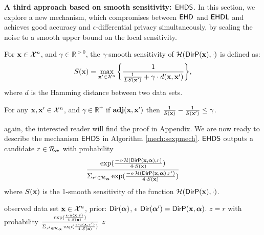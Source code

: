 \documentclass{article}
\begin{document}
\noindent \textbf{A third approach based on smooth sensitivity: $\hexpmech$}. 
\label{sec_ehds}
In this section, we explore a new mechanism, which compromises between $\mathsf{EHD}$ and $\mathsf{EHDL}$ and  achieves good accuracy and $\epsilon$-differential privacy simultaneously,
by scaling the noise to a smooth upper bound on the local sensitivity.
\begin{definition}
\label{def_gamma_smooth}
For $\textbf{x}\in\mathcal{X}^n$, and $\gamma \in \mathbb{R}^{> 0}$, the $\gamma$-smooth sensitivity of $\mathcal{H}(\mathsf{DirP}(\textbf{x}),\cdot)$ is defined as:
\begin{equation}
  \label{eq_smooth}
   S(\textbf{x})=\max_{\textbf{x}' \in \mathcal{X}^{n}}\bigg \{ \frac{1}{\frac{1}{LS(\textbf{x}')} +\gamma \cdot d(\textbf{x},\textbf{x}')} \bigg \},
\end{equation}
where $d$ is the Hamming distance between two data sets.
\end{definition}

\begin{thm}
  \label{thm_gamma_smooth}
  For any $\textbf{x}, \textbf{x}'\in\mathcal{X}^n$, and $\gamma \in \mathbb{R}^{+}$
  if  $\textbf{adj}(\textbf{x},\textbf{x}')$ then $\frac{1}{S(\textbf{x})} - \frac{1}{S(\textbf{x}')} \leq \gamma$.
\end{thm}
again, the interested reader will find the proof in Appendix.
We are now ready to describe the mechanism $\hexpmech$ in Algorithm \ref{mech:sexpmech}. $\hexpmech$ outputs a candidate $r \in \mathcal{R}_{\boldsymbol{\alpha}}$ with probability
\[
 \frac
  {\exp(\frac{-\epsilon\cdot \mathcal{H}(\mathsf{DirP}(\textbf{x},\boldsymbol{\alpha}), r)}{4\cdot S(\textbf{x})})}
{\Sigma_{r' \in \mathcal{R}_{\boldsymbol{\alpha}}}\exp(\frac{-\epsilon\cdot \mathcal{H}(\mathsf{DirP}(\textbf{x},\boldsymbol{\alpha}), r')}{4\cdot S(\textbf{x})})}
\]
where $S(\textbf{x})$ is the 1-smooth sensitivity of  the function $\mathcal{H}(\mathsf{DirP}(\textbf{x}),\cdot)$. {\color{red}{why do we choose 1???}}
  \begin{algorithm}
  \caption{$\hexpmech$}
  \label{mech:sexpmech}
  \begin{algorithmic}
  \INPUT observed data set $\textbf{x} \in \mathcal{X}^n$, prior: $\mathsf{Dir}(\boldsymbol{\alpha})$, $\epsilon$
  \STATE {} $\mathsf{Dir}(\boldsymbol{\alpha}')= \mathsf{DirP}(\textbf{x},\boldsymbol{\alpha})$.   
  \STATE {} $z=r$ with probability $\frac{\exp(\frac{\epsilon\cdot u(\textbf{x}, {r})}{4\cdot S(\textbf{x})})}{\Sigma_{r' \in \mathcal{R}_{\boldsymbol{\alpha}}}\exp(\frac{\epsilon\cdot u(\textbf{x}, r')}{4\cdot S(\textbf{x})})}$
 $z$
  \end{algorithmic}
\end{algorithm}
\end{document}
